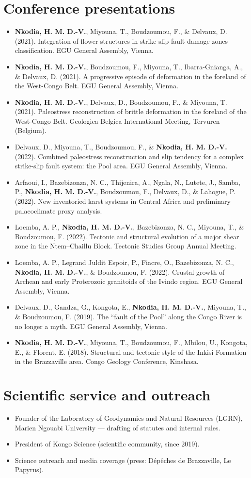 \documentclass[11pt,a4paper]{article}
\newcommand{\hy}{\textbf{Nkodia, H. M. D.-V.}}
\begin{document}
\section{Conference presentations}
\begin{itemize}
\item \hy, Miyouna, T., Boudzoumou, F., \& Delvaux, D. (2021). Integration of flower structures in strike-slip fault damage zones classification. EGU General Assembly, Vienna.
\item \hy, Boudzoumou, F., Miyouna, T., Ibarra-Gnianga, A., \& Delvaux, D. (2021). A progressive episode of deformation in the foreland of the West-Congo Belt. EGU General Assembly, Vienna.
\item \hy, Delvaux, D., Boudzoumou, F., \& Miyouna, T. (2021). Paleostress reconstruction of brittle deformation in the foreland of the West-Congo Belt. Geologica Belgica International Meeting, Tervuren (Belgium).
\item Delvaux, D., Miyouna, T., Boudzoumou, F., \& \hy (2022). Combined paleostress reconstruction and slip tendency for a complex strike-slip fault system: the Pool area. EGU General Assembly, Vienna.
\item Arfaoui, I., Bazebizonza, N. C., Thijenira, A., Ngala, N., Lutete, J., Samba, P., \hy, Boudzoumou, F., Delvaux, D., \& Lahogue, P. (2022). New inventoried karst systems in Central Africa and preliminary palaeoclimate proxy analysis.
\item Loemba, A. P., \hy, Bazebizonza, N. C., Miyouna, T., \& Boudzoumou, F. (2022). Tectonic and structural evolution of a major shear zone in the Ntem--Chaillu Block. Tectonic Studies Group Annual Meeting.
\item Loemba, A. P., Legrand Juldit Espoir, P., Fiacre, O., Bazebizonza, N. C., \hy, \& Boudzoumou, F. (2022). Crustal growth of Archean and early Proterozoic granitoids of the Ivindo region. EGU General Assembly, Vienna.
\item Delvaux, D., Gandza, G., Kongota, E., \hy, Miyouna, T., \& Boudzoumou, F. (2019). The ``fault of the Pool'' along the Congo River is no longer a myth. EGU General Assembly, Vienna.
\item \hy, Miyouna, T., Boudzoumou, F., Mbilou, U., Kongota, E., \& Florent, E. (2018). Structural and tectonic style of the Inkisi Formation in the Brazzaville area. Congo Geology Conference, Kinshasa.
\end{itemize}

\section{Scientific service and outreach}
\begin{itemize}
\item Founder of the Laboratory of Geodynamics and Natural Resources (LGRN), Marien Ngouabi University — drafting of statutes and internal rules.
\item President of Kongo Science (scientific community, since 2019).
\item Science outreach and media coverage (press: Dépêches de Brazzaville, Le Papyrus).
\end{itemize}
\end{document}
